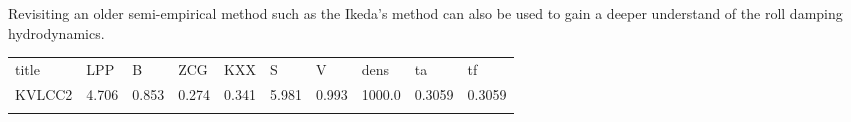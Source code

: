 Revisiting an older semi-empirical method such as the Ikeda's method can
also be used to gain a deeper understand of the roll damping
hydrodynamics.
 
            
    
    \begin{longtable}[c]{@{}llllllllll@{}}
\toprule\addlinespace
title & LPP & B & ZCG & KXX & S & V & dens & ta & tf\\\addlinespace 
\midrule\endhead
KVLCC2 & 4.706 & 0.853 & 0.274 & 0.341 & 5.981 & 0.993 & 1000.0 & 0.3059 & 0.3059\\\addlinespace 
\bottomrule 
 \end{longtable}

    

    